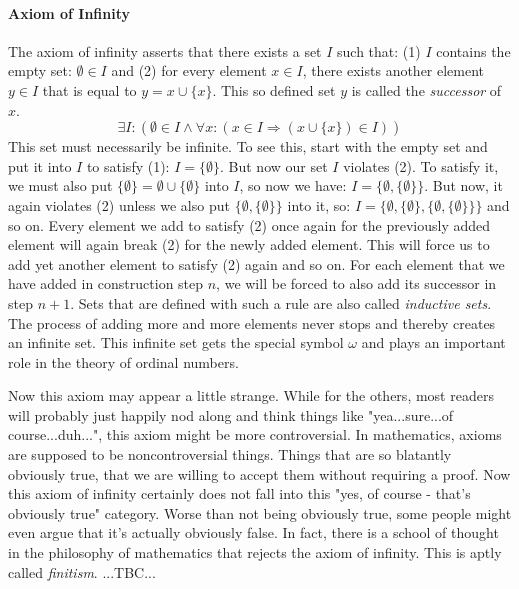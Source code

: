 \paragraph{Axiom of Infinity}
The axiom of infinity asserts that there exists a set $I$ such that: (1) $I$ contains the empty set: $\emptyset \in I$ and (2) for every element $x \in I$, there exists another element $y \in I$ that is equal to $y = x \cup \{ x\}$. This so defined set $y$ is called the \emph{successor} of $x$.
\begin{equation}
\exists I: ( \emptyset\in I \wedge \forall x: (x \in I \Rightarrow (x \cup \{x\}) \in I ))
\end{equation}
This set must necessarily be infinite. To see this, start with the empty set and put it into $I$ to satisfy (1): $I = \{\emptyset\}$. But now our set $I$ violates (2). To satisfy it, we must also put $\{ \emptyset \} = \emptyset \cup \{ \emptyset \} $ into $I$, so now we have: $I = \{\emptyset, \{ \emptyset \} \}$. But now, it again violates (2) unless we also put $\{\emptyset,  \{ \emptyset \} \}$ into it, so: $I = \{\emptyset, \{ \emptyset \}, \{\emptyset,  \{ \emptyset \} \}  \}$ and so on. Every element we add to satisfy (2) once again for the previously added element will again break (2) for the newly added element. This will force us to add yet another element to satisfy (2) again and so on. For each element that we have added in construction step $n$, we will be forced to also add its successor in step $n+1$. Sets that are defined with such a rule are also called \emph{inductive sets}. The process of adding more and more elements never stops and thereby creates an infinite set. This infinite set gets the special symbol $\omega$ and plays an important role in the theory of ordinal numbers. 


\medskip
Now this axiom may appear a little strange. While for the others, most readers will probably just happily nod along and think things like "yea...sure...of course...duh...", this axiom might be more controversial.
In mathematics, axioms are supposed to be noncontroversial things. Things that are so blatantly obviously true, that we are willing to accept them without requiring a proof. Now this axiom of infinity certainly does not fall into this "yes, of course - that's obviously true" category. Worse than not being obviously true, some people might even argue that it's actually obviously false. In fact, there is a school of thought in the philosophy of mathematics that rejects the axiom of infinity. This is aptly called \emph{finitism}. ...TBC...

